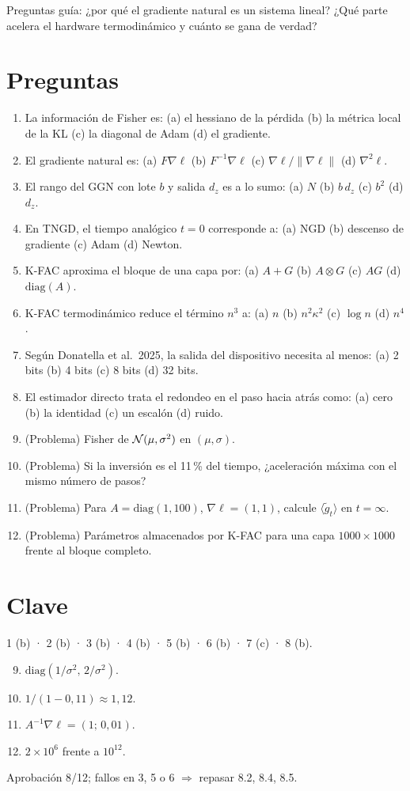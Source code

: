 \documentclass[11pt,a4paper]{article}
\begin{document}
\noindent Preguntas guía: ¿por qué el gradiente natural es un sistema lineal? ¿Qué parte acelera el hardware termodinámico y cuánto se gana de verdad?
\section*{Preguntas}
\begin{enumerate}
\item La información de Fisher es: (a) el hessiano de la pérdida (b) la métrica local de la KL (c) la diagonal de Adam (d) el gradiente.
\item El gradiente natural es: (a) $F\nabla\ell$ (b) $F^{-1}\nabla\ell$ (c) $\nabla\ell/\|\nabla\ell\|$ (d) $\nabla^2\ell$.
\item El rango del GGN con lote $b$ y salida $d_z$ es a lo sumo: (a) $N$ (b) $b\,d_z$ (c) $b^2$ (d) $d_z$.
\item En TNGD, el tiempo analógico $t=0$ corresponde a: (a) NGD (b) descenso de gradiente (c) Adam (d) Newton.
\item K-FAC aproxima el bloque de una capa por: (a) $A+G$ (b) $A\otimes G$ (c) $AG$ (d) $\mathrm{diag}(A)$.
\item K-FAC termodinámico reduce el término $n^3$ a: (a) $n$ (b) $n^2\kappa^2$ (c) $\log n$ (d) $n^4$.
\item Según Donatella et al.\ 2025, la salida del dispositivo necesita al menos: (a) 2 bits (b) 4 bits (c) 8 bits (d) 32 bits.
\item El estimador directo trata el redondeo en el paso hacia atrás como: (a) cero (b) la identidad (c) un escalón (d) ruido.
\item (Problema) Fisher de $\mathcal{N}(\mu,\sigma^2)$ en $(\mu,\sigma)$.
\item (Problema) Si la inversión es el 11\,\% del tiempo, ¿aceleración máxima con el mismo número de pasos?
\item (Problema) Para $A=\mathrm{diag}(1,100)$, $\nabla\ell=(1,1)$, calcule $\langle\tilde g_t\rangle$ en $t=\infty$.
\item (Problema) Parámetros almacenados por K-FAC para una capa $1000\times1000$ frente al bloque completo.
\end{enumerate}
\newpage
\section*{Clave}
1 (b) · 2 (b) · 3 (b) · 4 (b) · 5 (b) · 6 (b) · 7 (c) · 8 (b).
\begin{enumerate}\setcounter{enumi}{8}
\item $\mathrm{diag}(1/\sigma^2,\,2/\sigma^2)$.
\item $1/(1-0{,}11)\approx1{,}12$.
\item $A^{-1}\nabla\ell=(1;\,0{,}01)$.
\item $2\times10^6$ frente a $10^{12}$.
\end{enumerate}
Aprobación 8/12; fallos en 3, 5 o 6 $\Rightarrow$ repasar 8.2, 8.4, 8.5.
\end{document}
